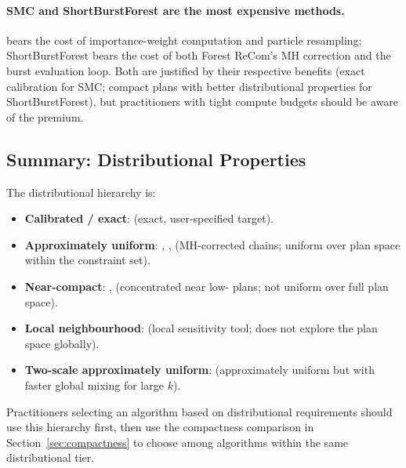 \paragraph{SMC and ShortBurstForest are the most expensive methods.}
\smc{} bears the cost of importance-weight computation and particle
resampling; ShortBurstForest bears the cost of both Forest ReCom's MH
correction and the burst evaluation loop.
Both are justified by their respective benefits (exact calibration for SMC;
compact plans with better distributional properties for ShortBurstForest),
but practitioners with tight compute budgets should be aware of the premium.

\subsection{Summary: Distributional Properties}

The distributional hierarchy is:
\begin{itemize}
  \item \textbf{Calibrated / exact}: \smc{} (exact, user-specified target).
  \item \textbf{Approximately uniform}: \fr{}, \msp{}, \vra{} (MH-corrected
        chains; uniform over plan space within the constraint set).
  \item \textbf{Near-compact}: \sburst{}, \sburstf{} (concentrated near low-\ec{}
        plans; not uniform over full plan space).
  \item \textbf{Local neighbourhood}: \flip{} (local sensitivity tool; does
        not explore the plan space globally).
  \item \textbf{Two-scale approximately uniform}: \ms{} (approximately
        uniform but with faster global mixing for large $k$).
\end{itemize}

Practitioners selecting an algorithm based on distributional requirements
should use this hierarchy first, then use the compactness comparison in
Section~\ref{sec:compactness} to choose among algorithms within the same
distributional tier.

